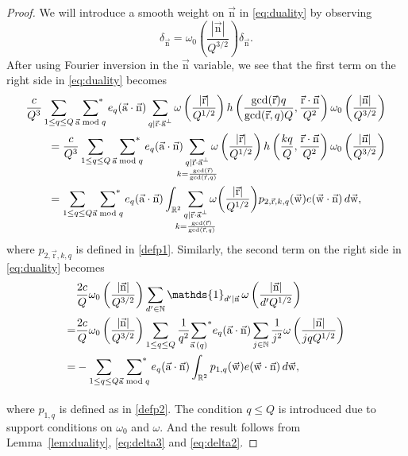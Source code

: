 \documentclass[letterpaper,11pt]{amsart}
\numberwithin{equation}{section}
\theoremstyle{definition}
\numberwithin{equation}{section}
\newcommand{\NN}{\mathbb{N}}
\newcommand{\starsum}{\sideset{}{^*}\sum}
\newcommand{\ua}{\vec{\mathrm{a}}}
\newcommand{\ur}{\vec{\mathrm{r}}}
\newcommand{\uw}{{\vec{\mathrm{w}}}}
\newcommand{\N}{\mathbb{N}}
\newcommand{\R}{\mathbb{R}}
\newcommand{\nn}{\vec{\mathrm{n}}}
\begin{document}
\begin{proof}
	We will introduce a smooth weight on $\nn$ in \eqref{eq:duality} by observing
	\[
	\delta_{\nn}
	= 
	\omega_0\left(\frac{|\nn|}{Q^{3/2}}\right)
	\delta_{\nn}.
	\]
After using Fourier inversion in the $\nn$ variable, we see that the first term on the right side in \eqref{eq:duality} becomes 
\begin{align}\nonumber
\MoveEqLeft\frac{c}{Q^3}
\sum_{\substack{ 1\leq q\leq Q}}
\;\starsum_{\ua \bmod q }
e_{q}(\ua\cdot \nn)
\sum_{\substack{ q\mid \ur\cdot \ua^\perp}}
\omega\left(
\frac{ |\ur| }{ Q^{1/2}}
\right)
h\left(
\frac{\gcd(\ur)q}{\gcd(\ur,q)Q},
\frac{\ur\cdot \nn }{ Q^2}
\right)\omega_0\left(\frac{|\nn|}{Q^{3/2}}\right)\\\nonumber
&=\frac{c}{Q^3}\sum_{\substack{ 1\leq q\leq Q}}
\;\starsum_{\ua \bmod q }
e_{q}(\ua\cdot \nn)
\sum_{\substack{q\mid \ur\cdot \ua^\perp\\\mathclap{k=\frac{\gcd(\ur)}{\gcd(\ur, q)}}}}
\omega\left(
\frac{ |\ur| }{ Q^{1/2}}
\right)
h\left(
\frac{kq}{Q},
\frac{\ur\cdot \nn }{ Q^2}
\right)\omega_0\left(\frac{|\nn|}{Q^{3/2}}\right)\\
&=
\sum_{1\leq q \leq Q}
\underset{\hphantom{\ua\bmod{q}}}{\starsum_{\ua\bmod{q}}}
e_q(\ua\cdot \nn)
\int_{\R^2}
\sum_{\substack{q\mid \ur\cdot \ua^\perp\\ \mathclap{k=\frac{\gcd(\ur)}{\gcd(\ur, q)}}}}
\omega\bigg(
\frac{ |\ur| }{ Q^{1/2}}
\bigg)
p_{2,\ur,k,q}(\uw)
e(\uw\cdot\nn)\,d\uw,
\label{eq:delta3}
\end{align}
where $p_{{2, \ur, k, q}}$ is defined in \eqref{defp1}.
Similarly, the second term on the right side in \eqref{eq:duality} becomes 
\begin{align}\nonumber
	&\frac{2c}{Q}
	\omega_0\left(\frac{|\nn|}{Q^{3/2}}\right)
	\sum_{d'\in\N}
\mathds{1}_{d'\mid \nn}\,
	\omega
	\left(\frac{|\nn|}{d'Q^{1/2}}
	\right)
	\\=&\frac{2c}{Q}\nonumber
	\omega_0\left(\frac{|\nn|}{Q^{3/2}}\right)
	\sum_{1\leq q\leq Q}
	\frac{1}{q^2}
	{\sum_{\ua\,(q)}}^*
	e_q(\ua\cdot\nn)
	\sum_{j\in\NN}
	\frac{1}{j^2}
	\omega
	\left(\frac{|\nn|}{jqQ^{1/2}}
	\right)
	\nonumber
	\\
	=&
	-\sum_{1\leq q\leq Q}
	\underset{\hphantom{\ua\bmod{q}}}{\starsum_{\ua\bmod{q}}}
	e_q(\ua\cdot \nn)
	\int_{\R^2}
	p_{1,q}(\uw)
	e(\uw\cdot\nn)\,d\uw,
	\label{eq:delta2}
\end{align}
where $p_{1,q}$ is defined as in \eqref{defp2}.
 The condition $q\leq Q$ is introduced due to support conditions on $\omega_0$ and $\omega$.
And the result follows from Lemma~\ref{lem:duality}, \eqref{eq:delta3} and \eqref{eq:delta2}.
\end{proof}
\end{document}
